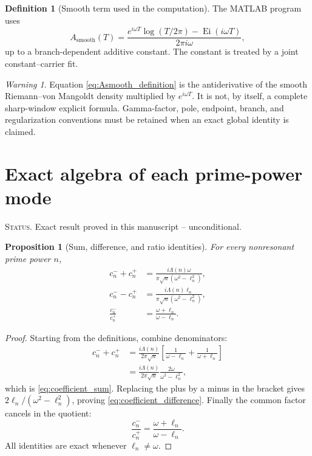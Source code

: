 \documentclass[11pt]{amsart}
\numberwithin{equation}{section}
\theoremstyle{plain}
\newtheorem{proposition}[theorem]{Proposition}
\theoremstyle{definition}
\newtheorem{definition}[theorem]{Definition}
\theoremstyle{remark}
\newtheorem{warning}[theorem]{Warning}
\DeclareMathOperator{\Ei}{Ei}
\newcommand{\1}{\mathbf{1}}
\newcommand{\statusnote}[1]{%
  \par\smallskip\noindent
  \begingroup\footnotesize\textsc{Status.} #1\endgroup
  \par\smallskip}
\begin{document}
\begin{definition}[Smooth term used in the computation]
\label{def:Asmooth}
The MATLAB program uses
\begin{equation}
A_{\mathrm{smooth}}(T)
=
\frac{
e^{i\omega T}\log(T/2\pi)-\Ei(i\omega T)
}{
2\pi i\omega
},
\label{eq:Asmooth_definition}
\end{equation}
up to a branch-dependent additive constant.  The constant is treated by
a joint constant--carrier fit.
\end{definition}

\begin{warning}
\label{warn:Asmooth_status}
Equation \eqref{eq:Asmooth_definition} is the antiderivative of the
smooth Riemann--von Mangoldt density multiplied by \(e^{i\omega T}\).
It is not, by itself, a complete sharp-window explicit formula.
Gamma-factor, pole, endpoint, branch, and regularization conventions must
be retained when an exact global identity is claimed.
\end{warning}

\section{Exact algebra of each prime-power mode}
\label{sec:mode_algebra}

\statusnote{Exact result proved in this manuscript -- unconditional.}
\begin{proposition}[Sum, difference, and ratio identities]
\label{prop:coefficient_identities}
For every nonresonant prime power \(n\),
\begin{align}
c_n^-+c_n^+
&=
\frac{i\Lambda(n)\omega}
{\pi\sqrt n(\omega^2-\ell_n^2)},
\label{eq:coefficient_sum}
\\
c_n^--c_n^+
&=
\frac{i\Lambda(n)\ell_n}
{\pi\sqrt n(\omega^2-\ell_n^2)},
\label{eq:coefficient_difference}
\\
\frac{c_n^-}{c_n^+}
&=
\frac{\omega+\ell_n}{\omega-\ell_n}.
\label{eq:coefficient_ratio}
\end{align}
\end{proposition}

\begin{proof}
Starting from the definitions, combine denominators:
\begin{align}
c_n^-+c_n^+
&=
\frac{i\Lambda(n)}{2\pi\sqrt n}
\left[
\frac1{\omega-\ell_n}+\frac1{\omega+\ell_n}
\right]
\label{eq:coefficient_sum_proof_one}
\\
&=
\frac{i\Lambda(n)}{2\pi\sqrt n}
\frac{2\omega}{\omega^2-\ell_n^2},
\label{eq:coefficient_sum_proof_two}
\end{align}
which is \eqref{eq:coefficient_sum}.  Replacing the plus by a minus in
the bracket gives \(2\ell_n/(\omega^2-\ell_n^2)\), proving
\eqref{eq:coefficient_difference}.  Finally the common factor cancels in
the quotient:
\begin{equation}
\frac{c_n^-}{c_n^+}
=
\frac{\omega+\ell_n}{\omega-\ell_n}.
\label{eq:coefficient_ratio_proof}
\end{equation}
All identities are exact whenever \(\ell_n\neq\omega\).
\end{proof}
\end{document}
